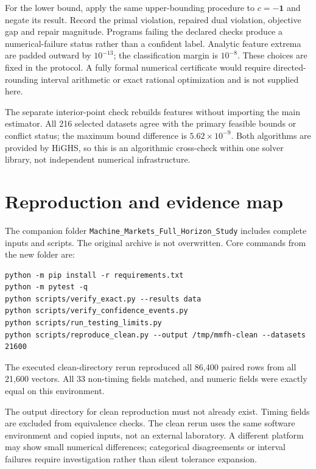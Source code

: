 \documentclass[11pt]{article}
\theoremstyle{remark}\newtheorem{remark}[proposition]{Remark}
\begin{document}
For the lower bound, apply the same upper-bounding procedure to $c=-\mathbf1$ and negate its result. Record the primal violation, repaired dual violation, objective gap and repair magnitude. Programs failing the declared checks produce a numerical-failure status rather than a confident label. Analytic feature extrema are padded outward by $10^{-13}$; the classification margin is $10^{-8}$. These choices are fixed in the protocol. A fully formal numerical certificate would require directed-rounding interval arithmetic or exact rational optimization and is not supplied here.

The separate interior-point check rebuilds features without importing the main estimator. All 216 selected datasets agree with the primary feasible bounds or conflict status; the maximum bound difference is $5.62\times10^{-9}$. Both algorithms are provided by HiGHS, so this is an algorithmic cross-check within one solver library, not independent numerical infrastructure.

\section{Reproduction and evidence map}
The companion folder \texttt{Machine\_Markets\_Full\_Horizon\_Study} includes complete inputs and scripts. The original archive is not overwritten. Core commands from the new folder are:
\begin{lstlisting}
python -m pip install -r requirements.txt
python -m pytest -q
python scripts/verify_exact.py --results data
python scripts/verify_confidence_events.py
python scripts/run_testing_limits.py
python scripts/reproduce_clean.py --output /tmp/mmfh-clean --datasets 21600
\end{lstlisting}
The executed clean-directory rerun reproduced all 86,400 paired rows from all 21,600 vectors. All 33 non-timing fields matched, and numeric fields were exactly equal on this environment.

The output directory for clean reproduction must not already exist. Timing fields are excluded from equivalence checks. The clean rerun uses the same software environment and copied inputs, not an external laboratory. A different platform may show small numerical differences; categorical disagreements or interval failures require investigation rather than silent tolerance expansion.
\end{document}
